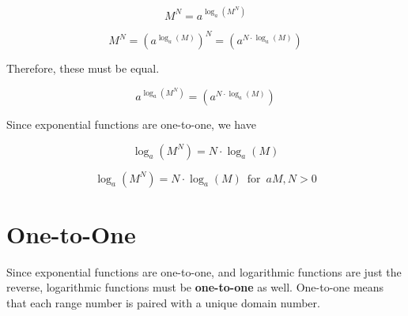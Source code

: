 \documentclass{ximera}
\begin{document}
\[   M^N = a^{\log_a(M^N)}                  \]

\[   M^N = (a^{\log_a(M)})^N =     (a^{N \cdot \log_a(M)})             \]


Therefore, these must be equal.


\[    a^{\log_a(M^N)}      =    (a^{N \cdot \log_a(M)})                \]





Since exponential functions are one-to-one, we have 


\[    \log_a(M^N)    =   N \cdot \log_a(M)            \]








\begin{template} 

\[    \log_a(M^N)    =   N \cdot \log_a(M)       \, \text{ for } \, a M, N  > 0        \]


\end{template}


















\section{One-to-One}







Since exponential functions are one-to-one, and logarithmic functions are just the reverse, logarithmic functions must be \textbf{one-to-one} as well. One-to-one means that each range number is paired with a unique domain number.
\end{document}
